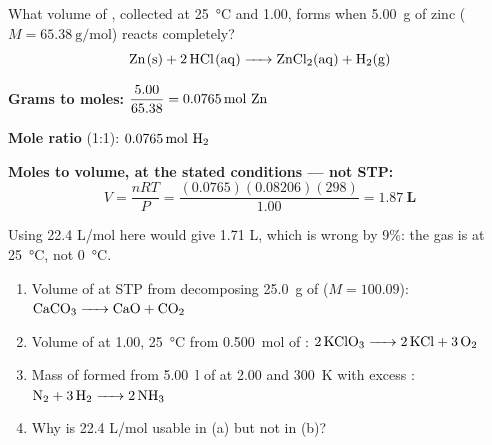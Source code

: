 \documentclass{apchem-worksheet}
\begin{document}
\begin{workedexample}
What volume of , collected at \SI{25}{\celsius} and
\SI{1.00}{\atm}, forms when \SI{5.00}{\gram} of zinc
($M = \SI{65.38}{\gram\per\mole}$) reacts completely?
\[ \ce{Zn(s) + 2HCl(aq) -> ZnCl2(aq) + H2(g)} \]

\textbf{Grams to moles:}
$\dfrac{5.00}{65.38} = \SI{0.0765}{\mole}~\ce{Zn}$

\textbf{Mole ratio} (1:1): $\SI{0.0765}{\mole}~\ce{H2}$

\textbf{Moles to volume, at the stated conditions --- not STP:}
\[ V = \frac{nRT}{P} = \frac{(0.0765)(0.08206)(298)}{1.00}
     = \mathbf{1.87~L} \]

Using 22.4 L/mol here would give 1.71 L, which is wrong by 9\%: the gas
is at \SI{25}{\celsius}, not \SI{0}{\celsius}.
\end{workedexample}

\begin{yourturn}
\begin{enumerate}[leftmargin=*,itemsep=0.5em]
  \item Volume of  at STP from decomposing \SI{25.0}{\gram} of
         ($M = 100.09$): $\ce{CaCO3 -> CaO + CO2}$
        \workspace[1.8cm]
  \item Volume of  at \SI{1.00}{\atm}, \SI{25}{\celsius} from
        \SI{0.500}{\mole} of :
        $\ce{2KClO3 -> 2KCl + 3O2}$ \workspace[1.8cm]
  \item Mass of  formed from \SI{5.00}{\litre} of  at
        \SI{2.00}{\atm} and \SI{300}{\kelvin} with excess :
        $\ce{N2 + 3H2 -> 2NH3}$ \workspace[2cm]
  \item Why is 22.4 L/mol usable in (a) but not in (b)?
        \workspace[1.4cm]
\end{enumerate}
\end{yourturn}
\end{document}
